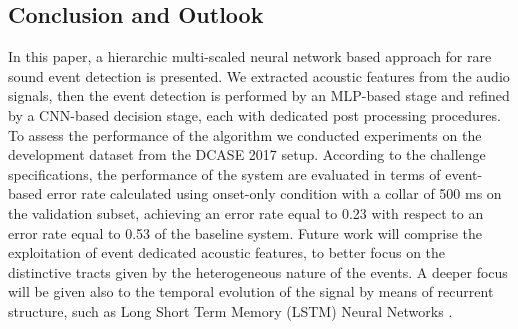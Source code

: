 \documentclass{article}
\begin{document}
\begin{sloppy}
\section{Conclusion and Outlook}
\label{sec:conclusion}
 In this paper, a hierarchic multi-scaled neural network based approach for rare sound event detection is presented.  We extracted acoustic features from the audio signals, then the event detection is performed by an MLP-based stage and refined by a CNN-based decision stage, each with dedicated post processing procedures. To assess the performance of the algorithm we conducted experiments on the development dataset from the DCASE 2017 setup. According to the challenge specifications, the performance of the system are evaluated in terms of event-based error rate calculated using onset-only condition with a collar of 500 ms on the validation subset, achieving an error rate equal to 0.23 with respect to an error rate equal to 0.53 of the baseline system. Future work will comprise the exploitation of event dedicated acoustic features, to better focus on the distinctive tracts given by the heterogeneous nature of the events. A deeper focus will be given also to the temporal evolution of the signal by means of recurrent structure, such as Long Short Term Memory (LSTM) Neural Networks \cite{hochreiter1997long}.
%



%


\end{sloppy}
\end{document}
